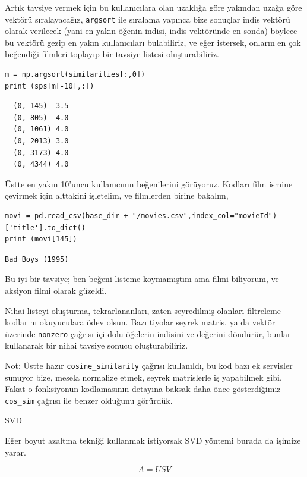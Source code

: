\documentclass[12pt,fleqn]{article}\usepackage{../../common}
\begin{document}
Artık tavsiye vermek için bu kullanıcılara olan uzaklığa göre yakından uzağa
göre vektörü sıralayacağız, \verb!argsort! ile sıralama yapınca bize sonuçlar
indis vektörü olarak verilecek (yani en yakın öğenin indisi, indis vektöründe en
sonda) böylece bu vektörü gezip en yakın kullanıcıları bulabiliriz, ve eğer
istersek, onların en çok beğendiği filmleri toplayıp bir tavsiye listesi
oluşturabiliriz.

\begin{verbatim}
m = np.argsort(similarities[:,0])
print (sps[m[-10],:])
\end{verbatim}

\begin{verbatim}
  (0, 145)	3.5
  (0, 805)	4.0
  (0, 1061)	4.0
  (0, 2013)	3.0
  (0, 3173)	4.0
  (0, 4344)	4.0
\end{verbatim}

Üstte en yakın 10'uncu kullanıcının beğenilerini görüyoruz. Kodları film ismine 
çevirmek için alttakini işletelim, ve filmlerden birine bakalım,

\begin{verbatim}
movi = pd.read_csv(base_dir + "/movies.csv",index_col="movieId")['title'].to_dict()
print (movi[145])
\end{verbatim}

\begin{verbatim}
Bad Boys (1995)
\end{verbatim}

Bu iyi bir tavsiye; ben beğeni listeme koymamıştım ama filmi biliyorum,
ve aksiyon filmi olarak güzeldi.

Nihai listeyi oluşturma, tekrarlananları, zaten seyredilmiş olanları filtreleme
kodlarını okuyuculara ödev olsun. Bazı tiyolar seyrek matris, ya da vektör
üzerinde \verb!nonzero! çağrısı içi dolu öğelerin indisini ve değerini döndürür,
bunları kullanarak bir nihai tavsiye sonucu oluşturabiliriz.

Not: Üstte hazır \verb!cosine_similarity! çağrısı kullanıldı, bu kod bazı ek
servisler sunuyor bize, mesela normalize etmek, seyrek matrislerle iş yapabilmek
gibi. Fakat o fonksiyonun kodlamasının detayına baksak daha önce gösterdiğimiz
\verb!cos_sim! çağrısı ile benzer olduğunu görürdük.

SVD

Eğer boyut azaltma tekniği kullanmak istiyorsak SVD yöntemi burada da işimize
yarar.

$$ A = USV  $$
\end{document}
